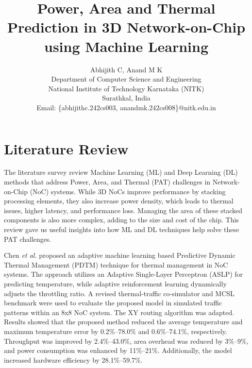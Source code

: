 \documentclass[conference]{IEEEtran}
\begin{document}
\title{Power, Area and Thermal Prediction in 3D Network-on-Chip using Machine Learning}

\author{Abhijith C, Anand M K \\

Department of Computer Science and Engineering \\ 
	National Institute of Technology Karnataka (NITK) \\ 
	Surathkal, India\\
Email: \{abhijithc.242cs003, anandmk.242cs008\}@nitk.edu.in}


\maketitle

\section{Literature Review}
The literature survey review Machine Learning (ML) and Deep Learning (DL) methods that address Power, Area, and Thermal (PAT) challenges in Network-on-Chip (NoC) systems. While 3D NoCs improve performance by stacking processing elements, they also increase power density, which leads to thermal issues, higher latency, and performance loss. Managing the area of these stacked components is also more complex, adding to the size and cost of the chip. This review gave us useful insights into how ML and DL techniques help solve these PAT challenges.  

Chen \textit{et al.}\cite{1} proposed an adaptive machine learning based Predictive Dynamic Thermal Management (PDTM) technique for thermal management in NoC systems. The approach utilizes an Adaptive Single-Layer Perceptron (ASLP) for predicting temperature, while adaptive reinforcement learning dynamically adjusts the throttling ratio. A revised thermal-traffic co-simulator and MCSL benchmark were used to evaluate the proposed model in simulated traffic patterns within an 8x8 NoC system. The XY routing algorithm was adapted. Results showed that the proposed method reduced the average temperature and maximum temperature error by 0.2\%–78.0\% and 0.6\%–74.1\%, respectively. Throughput was improved by 2.4\%–43.0\%, area overhead was reduced by 3\%–9\%, and power consumption was enhanced by 11\%–21\%. Additionally, the model increased hardware efficiency by 28.1\%–59.7\%.
\end{document}
